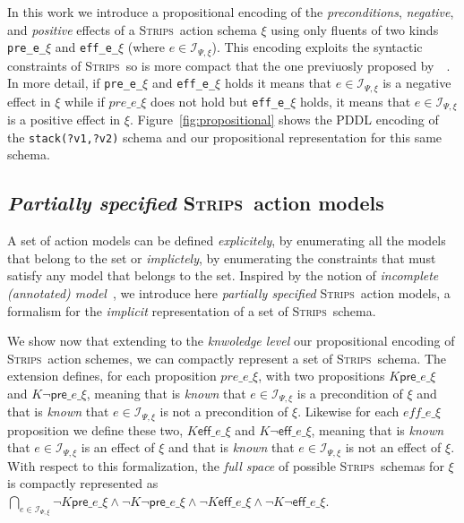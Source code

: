 \documentclass{article}
\newcommand{\pre}{\mathsf{pre}}     %
\newcommand{\eff}{\mathsf{eff}}     %
\newcommand{\strips}{\textsc{Strips}}
\begin{document}
In this work we introduce a propositional encoding of the {\em preconditions}, {\em negative}, and {\em positive} effects of a \strips\ action schema $\xi$ using only fluents of two kinds {\tt\small pre\_e\_$\xi$} and {\tt\small eff\_e\_$\xi$} (where $e\in{\mathcal I}_{\Psi,\xi}$). This encoding exploits the syntactic constraints of \strips\ so is more compact that the one previuosly proposed by~\citeauthor{aineto2018learning}~\citeyear{aineto2018learning}. In more detail, if {\tt\small pre\_e\_$\xi$} and {\tt\small eff\_e\_$\xi$} holds it means that $e\in{\mathcal I}_{\Psi,\xi}$ is a negative effect in $\xi$ while if $pre\_e\_\xi$ does not hold but {\tt\small eff\_e\_$\xi$} holds, it means that $e\in{\mathcal I}_{\Psi,\xi}$ is a positive effect in $\xi$. Figure~\ref{fig:propositional} shows the PDDL encoding of the {\tt\small stack(?v1,?v2)} schema and our propositional representation for this same schema. 

\subsection{{\em Partially specified} \strips\ action models}
A set of action models can be defined {\em explicitely}, by enumerating all the models that belong to the set or {\em implictely}, by enumerating the constraints that must satisfy any model that belongs to the set. Inspired by the notion of {\em incomplete (annotated) model}~\cite{sreedharan2018handling}, we introduce here {\em partially specified} \strips\ action models, a formalism for the {\em implicit} representation of a set of \strips\ schema.

We show now that extending to the {\em knwoledge level} our propositional encoding of \strips\ action schemes, we can compactly represent a set of \strips\ schema. The extension defines, for each proposition {\tt\small $pre\_e\_\xi$}, with two propositions {\tt\small $K\pre\_e\_\xi$} and {\tt\small $K\neg\pre\_e\_\xi$}, meaning that is {\em known} that $e\in{\mathcal I}_{\Psi,\xi}$ is a precondition of $\xi$ and that is {\em known} that $e\in{\mathcal I}_{\Psi,\xi}$ is not a precondition of $\xi$. Likewise for each {\tt\small $eff\_e\_\xi$} proposition we define these two, {\tt\small $K\eff\_e\_\xi$} and {\tt\small $K\neg\eff\_e\_\xi$}, meaning that is {\em known} that $e\in{\mathcal I}_{\Psi,\xi}$ is an effect of $\xi$ and that is {\em known} that $e\in{\mathcal I}_{\Psi,\xi}$ is not an effect of $\xi$. With respect to this formalization, the {\em full space} of possible \strips\ schemas for $\xi$ is compactly represented as {\tt\small $\bigcap_{e\in{\mathcal I}_{\Psi,\xi}} \neg K\pre\_e\_\xi\wedge \neg K\neg\pre\_e\_\xi \wedge\neg K\eff\_e\_\xi\wedge \neg K\neg\eff\_e\_\xi$}.
\end{document}
